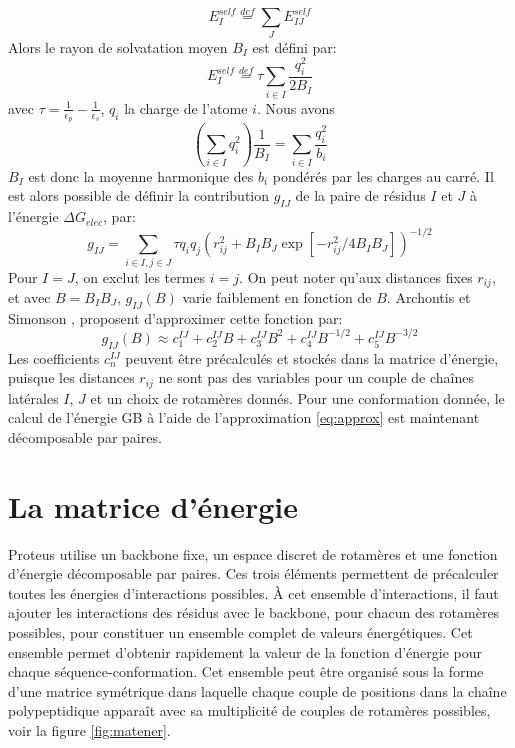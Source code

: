\begin{equation}
  E_I^{self} \stackrel{def}{=} \sum_J E_{IJ}^{self}
\end{equation}
Alors le rayon de solvatation moyen $B_I$ est défini par:
\begin{equation}
  E^{self}_I \stackrel{def}{=} \tau \sum_{i \in I} \frac{q_i^2}{2 B_I}
\end{equation} 
avec $ \tau = \frac{1}{\epsilon_p} - \frac{1}{\epsilon_s}$, $q_i$ la charge de l'atome $i$. Nous avons
\begin{equation}
\left( \sum_{i \in I} q_i^2 \right) \frac{1}{B_I} = \sum_{i \in I} \frac{q_i^2}{b_i}
\end{equation}
$B_I$ est donc la moyenne harmonique des $b_i$ pondérés par les charges au carré. Il est alors possible de définir la contribution $g_{IJ}$ de la paire de résidus $I$ et $J$ à l'énergie $\Delta G_{elec}$, par:
\begin{equation} 
g_{IJ} = \sum_{i \in I, j \in J} \tau q_i q_j \left( r_{ij}^2 + B_I B_J \exp[-r_{ij}^2/4 B_I B_J] \right)^{-1/2}
\label{eq:screen}
\end{equation}
Pour $I=J$, on exclut les termes $i=j$. On peut noter qu'aux distances fixes $r_{ij}$, et avec $B=B_IB_J$, $g_{IJ} (B)$ varie faiblement en fonction de $B$. Archontis et Simonson \cite{Archontis05}, proposent d'approximer cette fonction par:
\begin{equation}
  \label{eq:approx}
g_{IJ}(B) \approx c_1^{IJ} + c_2^{IJ} B + c_3^{IJ} B^2 + c_4^{IJ} B^{-1/2} + c_5^{IJ} B^{-3/2} 
\end{equation}
Les coefficients $c_n^{IJ}$ peuvent être précalculés et stockés dans la matrice d'énergie, puisque les distances $r_{ij}$ ne sont pas des variables pour un couple de chaînes latérales $I$, $J$ et un choix de rotamères donnés. Pour une conformation donnée, le calcul de l'énergie GB à l'aide de l'approximation \ref{eq:approx} est maintenant décomposable par paires.

\section{La matrice d'énergie}

Proteus utilise un backbone fixe, un espace discret de rotamères et une fonction d'énergie décomposable par paires. Ces trois éléments permettent de précalculer toutes les énergies d'interactions possibles. À cet ensemble d'interactions, il faut ajouter les interactions des résidus avec le backbone, pour chacun des rotamères possibles, pour constituer un ensemble complet de valeurs énergétiques. Cet ensemble  permet d'obtenir rapidement la valeur de la fonction d'énergie pour chaque séquence-conformation. Cet ensemble peut être organisé sous la forme d'une matrice symétrique dans laquelle chaque couple de positions dans la chaîne polypeptidique apparaît avec sa multiplicité de couples de rotamères possibles, voir la figure \ref{fig:matener}.      

